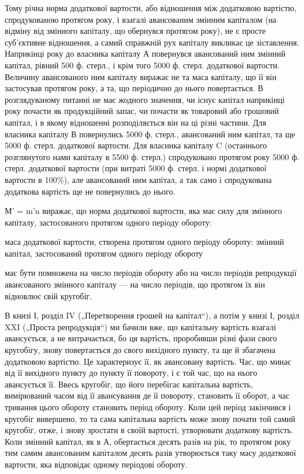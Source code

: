 Тому річна норма додаткової вартости, або відношення між додатковою
вартістю, спродукованою протягом року, і взагалі авансованим
змінним капіталом (на відміну від змінного капіталу, що обернувся
протягом року), не є просте суб’єктивне відношення, а самий
справжній рух капіталу викликає це зіставлення. Наприкінці року до
власника капіталу А повернувся авансований ним змінний капітал, рівний
500 ф. стерл., і крім того 5000 ф. стерл. додаткової вартости. Величину
авансованого ним капіталу виражає не та маса капіталу, що її він застосував
протягом року, а та, що періодично до нього повертається. В
розглядуваному питанні не має жодного значення, чи існує капітал наприкінці
року почасти як продукційний запас, чи почасти як товаровий
або грошовий капітал, і в якому відношенні розподіляється він на ці
різні частини. Для власника капіталу В повернулись 5000 ф. стерл., авансований
ним капітал, та ще 5000 ф. стерл. додаткової вартости. Для власника
капіталу C (останнього розглянутого нами капіталу в 5500 ф. стерл.)
спродуковано протягом року 5000 ф. стерл. додаткової вартости (при витраті
5000 ф. стерл. і нормі додаткової вартости в 100\%), але авансований
ним капітал, а так само і спродукована додаткова вартість ще не повернулись
до нього.

М' = m'n виражає, що норма додаткової вартости, яка має силу
для змінного капіталу, застосованого протягом одного періоду обороту:

маса додаткової вартости, створена протягом одного періоду обороту:
змінний капітал, застосований протягом одного періоду обороту

має бути помножена на число періодів обороту або на число періодів
репродукції авансованого змінного капіталу — на число періодів, що протягом
їх він відновлює свій кругобіг.

В книзі І, розділ IV („Перетворення грошей на капітал“), а потім у
книзі І, розділ XXI („Проста репродукція“) ми бачили вже, що капітальну
вартість взагалі авансується, а не витрачається, бо ця вартість,
проробивши різні фази свого кругобігу, знову повертається до свого
вихідного пункту, та ще й збагачена додатковою вартістю. Це характеризує
її, як авансовану вартість. Час, що минає від її вихідного пункту
до пункту її повороту, і є той час, що на нього авансується її. Ввесь
кругобіг, що його перебігає капітальна вартість, вимірюваний часом від її
авансування де її повороту, становить її оборот, а час тривання цього обороту
становить період обороту. Коли цей період закінчився і кругобіг
вивершено, то та сама капітальна вартість може знову почати той самий
кругобіг, отже, і знову зростати в своїй вартості, утворювати додаткову
вартість. Коли змінний капітал, як в А, обертається десять разів на рік,
то протягом року тим самим авансованим капіталом десять разів утворюється
таку масу додаткової вартости, яка відповідає одному періодові
обороту.

